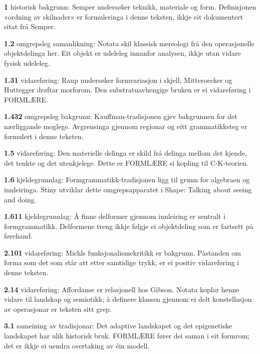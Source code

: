 \begin{widebody}
\noindent\hypertarget{kjeldenotat-1}{}\textbf{1} historisk bakgrunn: Semper undersøker teknikk, materiale og form. Definisjonen «ordning av skilnader» er formuleringa i denne teksten, ikkje eit dokumentert sitat frå Semper.\par\medskip
\noindent\hypertarget{kjeldenotat-1.2}{}\textbf{1.2} omgrepsleg samanlikning: Notata skil klassisk mereologi frå den operasjonelle objektdelinga her. Eit objekt er udeleleg innanfor analysen, ikkje utan vidare fysisk udeleleg.\par\medskip
\noindent\hypertarget{kjeldenotat-1.31}{}\textbf{1.31} vidareføring: Raup undersøker formvariasjon i skjell; Mitteroecker og Huttegger drøftar morforom. Den substratuavhengige bruken er ei vidareføring i FORMLÆRE.\par\medskip
\noindent\hypertarget{kjeldenotat-1.432}{}\textbf{1.432} omgrepsleg bakgrunn: Kauffman-tradisjonen gjev bakgrunnen for det nærliggande moglege. Avgrensinga gjennom regionar og eitt grammatikksteg er formulert i denne teksten.\par\medskip
\noindent\hypertarget{kjeldenotat-1.5}{}\textbf{1.5} vidareføring: Den materielle delinga er skild frå delinga mellom det kjende, det tenkte og det utenkjelege. Dette er FORMLÆRE si kopling til C-K-teorien.\par\medskip
\noindent\hypertarget{kjeldenotat-1.6}{}\textbf{1.6} kjeldegrunnlag: Formgrammatikk-tradisjonen ligg til grunn for algebraen og innleiringa. Stiny utviklar dette omgrepsapparatet i Shape: Talking about seeing and doing.\par\medskip
\noindent\hypertarget{kjeldenotat-1.611}{}\textbf{1.611} kjeldegrunnlag: Å finne delformer gjennom innleiring er sentralt i formgrammatikk. Delformene treng ikkje følgje ei objektdeling som er fastsett på førehand.\par\medskip
\noindent\hypertarget{kjeldenotat-2.101}{}\textbf{2.101} vidareføring: Michls funksjonalismekritikk er bakgrunn. Påstanden om forma som det som står att etter samtidige trykk, er ei positiv vidareføring i denne teksten.\par\medskip
\noindent\hypertarget{kjeldenotat-2.14}{}\textbf{2.14} vidareføring: Affordanse er relasjonell hos Gibson. Notata koplar henne vidare til landskap og semiotikk; å definere klassen gjennom ei delt konstellasjon av operasjonar er teksten sitt grep.\par\medskip
\noindent\hypertarget{kjeldenotat-3.1}{}\textbf{3.1} sameining av tradisjonar: Det adaptive landskapet og det epigenetiske landskapet har ulik historisk bruk. FORMLÆRE fører dei saman i eit formrom; det er ikkje ei uendra overtaking av éin modell.\par\medskip

\end{widebody}
